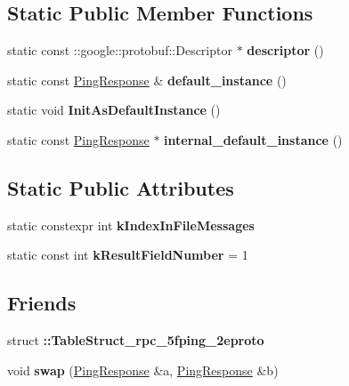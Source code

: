 \subsection*{Static Public Member Functions}
\begin{DoxyCompactItemize}
\item 
\mbox{\label{classcoappbrpc_1_1api_1_1PingResponse_a096f1cb3b59ba090e2364e6046fc64ae}} 
static const \+::google\+::protobuf\+::\+Descriptor $\ast$ {\bfseries descriptor} ()
\item 
\mbox{\label{classcoappbrpc_1_1api_1_1PingResponse_a3b94b3da8d8360f6ef0391430704bb78}} 
static const \hyperlink{classcoappbrpc_1_1api_1_1PingResponse}{Ping\+Response} \& {\bfseries default\+\_\+instance} ()
\item 
\mbox{\label{classcoappbrpc_1_1api_1_1PingResponse_aedac4ea4ba006b18b8b626df86c2b959}} 
static void {\bfseries Init\+As\+Default\+Instance} ()
\item 
\mbox{\label{classcoappbrpc_1_1api_1_1PingResponse_ac7fb962b9bf4988e781671562714cb4d}} 
static const \hyperlink{classcoappbrpc_1_1api_1_1PingResponse}{Ping\+Response} $\ast$ {\bfseries internal\+\_\+default\+\_\+instance} ()
\end{DoxyCompactItemize}
\subsection*{Static Public Attributes}
\begin{DoxyCompactItemize}
\item 
static constexpr int {\bfseries k\+Index\+In\+File\+Messages}
\item 
\mbox{\label{classcoappbrpc_1_1api_1_1PingResponse_afcd39a5d9d30c46247d6ea52e663cdd2}} 
static const int {\bfseries k\+Result\+Field\+Number} = 1
\end{DoxyCompactItemize}
\subsection*{Friends}
\begin{DoxyCompactItemize}
\item 
\mbox{\label{classcoappbrpc_1_1api_1_1PingResponse_a9bac0263ca50125d607502a4cace0488}} 
struct {\bfseries \+::\+Table\+Struct\+\_\+rpc\+\_\+5fping\+\_\+2eproto}
\item 
\mbox{\label{classcoappbrpc_1_1api_1_1PingResponse_adc03630ddebdbda83ba46f3d2561bed8}} 
void {\bfseries swap} (\hyperlink{classcoappbrpc_1_1api_1_1PingResponse}{Ping\+Response} \&a, \hyperlink{classcoappbrpc_1_1api_1_1PingResponse}{Ping\+Response} \&b)
\end{DoxyCompactItemize}


